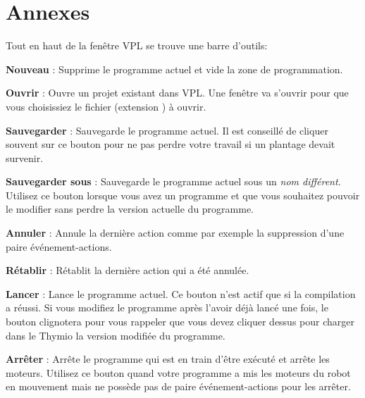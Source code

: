 \part{Annexes}

\label{a.toolbar}

Tout en haut de la fenêtre VPL se trouve une barre d'outils:

\begin{center}
\end{center}

\bigskip

\textbf{Nouveau} : Supprime le programme actuel et vide la zone de programmation.

\bigskip

\textbf{Ouvrir} : Ouvre un projet existant dans VPL.
Une fenêtre va s'ouvrir pour que vous choisissiez le fichier (extension ) à ouvrir.

\bigskip

\textbf{Sauvegarder} : Sauvegarde le programme actuel.
Il est conseillé de cliquer souvent sur ce bouton pour ne pas perdre votre travail
si un plantage devait survenir.

\bigskip

\textbf{Sauvegarder sous} : Sauvegarde le programme actuel sous un 
\emph{nom différent}. Utilisez ce bouton lorsque vous avez un programme et que vous
souhaitez pouvoir le modifier sans perdre la version actuelle du programme.

\bigskip

\textbf{Annuler} : Annule la dernière action comme par exemple la suppression
d'une paire événement-actions.\label{p.undo}

\bigskip

\textbf{Rétablir} : Rétablit la dernière action qui a été annulée.

\bigskip

\textbf{Lancer} : Lance le programme actuel.
Ce bouton n'est actif que si la compilation a réussi.
Si vous modifiez le programme après l'avoir déjà lancé une fois,
le bouton clignotera pour vous rappeler que vous devez cliquer dessus
pour charger dans le Thymio la version modifiée du programme.

\bigskip

\textbf{Arrêter} : Arrête le programme qui est en train d'être exécuté et
arrête les moteurs. Utilisez ce bouton quand votre programme a mis les moteurs du robot
en mouvement mais ne possède pas de paire événement-actions pour les arrêter.

